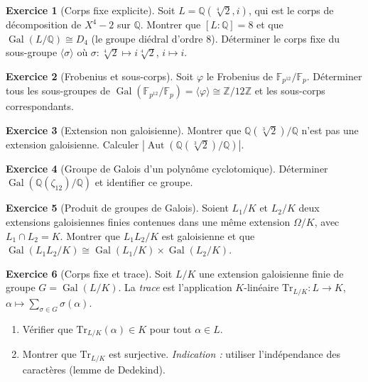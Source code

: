 \documentclass[12pt,a4paper,openany]{book}
\theoremstyle{definition}
\newtheorem{exercice}{Exercice}[chapter]
\newcommand{\Z}{\mathbb{Z}}
\newcommand{\Q}{\mathbb{Q}}
\newcommand{\F}{\mathbb{F}}
\newcommand{\Gal}{\operatorname{Gal}}
\newcommand{\Aut}{\operatorname{Aut}}
\begin{document}
\begin{exercice}[Corps fixe explicite]\label{exo:corps-fixe-explicite}
Soit $L = \Q(\sqrt[4]{2}, i)$, qui est le corps de décomposition de $X^4 - 2$
sur $\Q$. Montrer que $[L:\Q] = 8$ et que $\Gal(L/\Q) \cong D_4$ (le groupe
diédral d'ordre $8$). Déterminer le corps fixe du sous-groupe
$\langle\sigma\rangle$ où $\sigma \colon \sqrt[4]{2} \mapsto i\sqrt[4]{2}$,
$i \mapsto i$.
\end{exercice}

\begin{exercice}[Frobenius et sous-corps]\label{exo:frobenius-sous-corps}
Soit $\varphi$ le Frobenius de $\F_{p^{12}}/\F_p$. Déterminer tous les
sous-groupes de $\Gal(\F_{p^{12}}/\F_p) = \langle\varphi\rangle \cong
\Z/12\Z$ et les sous-corps correspondants.
\end{exercice}

\begin{exercice}[Extension non galoisienne]\label{exo:ext-non-galoisienne}
Montrer que $\Q(\sqrt[3]{2})/\Q$ n'est pas une extension galoisienne.
Calculer $|\Aut(\Q(\sqrt[3]{2})/\Q)|$.
\end{exercice}

\begin{exercice}[Groupe de Galois d'un polynôme cyclotomique]\label{exo:gal-cyclotomique-12}
Déterminer $\Gal(\Q(\zeta_{12})/\Q)$ et identifier ce groupe.
\end{exercice}

\begin{exercice}[Produit de groupes de Galois]\label{exo:produit-galois}
Soient $L_1/K$ et $L_2/K$ deux extensions galoisiennes finies contenues
dans une même extension $\Omega/K$, avec $L_1 \cap L_2 = K$. Montrer que
$L_1 L_2 / K$ est galoisienne et que
$\Gal(L_1 L_2/K) \cong \Gal(L_1/K) \times \Gal(L_2/K)$.
\end{exercice}

\begin{exercice}[Corps fixe et trace]\label{exo:corps-fixe-trace}
Soit $L/K$ une extension galoisienne finie de groupe $G = \Gal(L/K)$.
La \emph{trace} est l'application $K$-linéaire
$\mathrm{Tr}_{L/K} \colon L \to K$, $\alpha \mapsto \sum_{\sigma \in G}
\sigma(\alpha)$.
\begin{enumerate}[label=(\alph*)]
  \item Vérifier que $\mathrm{Tr}_{L/K}(\alpha) \in K$ pour tout
    $\alpha \in L$.
  \item Montrer que $\mathrm{Tr}_{L/K}$ est surjective.
    \emph{Indication :} utiliser l'indépendance des caractères (lemme de
    Dedekind).
\end{enumerate}
\end{exercice}
\end{document}
